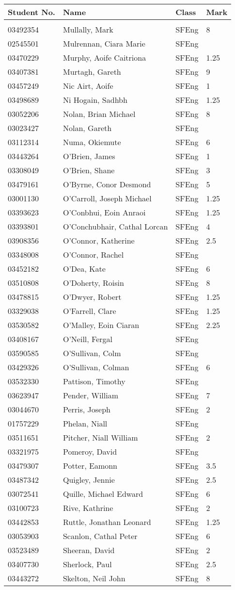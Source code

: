 \documentclass[a4paper]{article}
\begin{document}
\begin{tabular}{llll}
Student No.&Name&Class&Mark\\[3pt]
 \hline\\[3pt]
03492354&Mullally, Mark&SFEng&8\\
02545501&Mulrennan, Ciara Marie&SFEng&\\
03470229&Murphy, Aoife Caitriona&SFEng&1.25\\
03407381&Murtagh, Gareth&SFEng&9\\
03457249&Nic Airt, Aoife&SFEng&1\\
03498689&Ni Hogain, Sadhbh&SFEng&1.25\\
03052206&Nolan, Brian Michael&SFEng&8\\
03023427&Nolan, Gareth&SFEng&\\
03112314&Numa, Okiemute&SFEng&6\\
03443264&O'Brien, James&SFEng&1\\
03308049&O'Brien, Shane&SFEng&3\\
03479161&O'Byrne, Conor Desmond&SFEng&5\\
03001130&O'Carroll, Joseph Michael&SFEng&1.25\\
03393623&O'Conbhui, Eoin Anraoi&SFEng&1.25\\
03393801&O'Conchubhair, Cathal Lorcan&SFEng&4\\
03908356&O'Connor, Katherine&SFEng&2.5\\
03348008&O'Connor, Rachel&SFEng&\\
03452182&O'Dea, Kate&SFEng&6\\
03510808&O'Doherty, Roisin&SFEng&8\\
03478815&O'Dwyer, Robert&SFEng&1.25\\
03329038&O'Farrell, Clare&SFEng&1.25\\
03530582&O'Malley, Eoin Ciaran&SFEng&2.25\\
03408167&O'Neill, Fergal&SFEng&\\
03590585&O'Sullivan, Colm&SFEng&\\
03429326&O'Sullivan, Colman&SFEng&6\\
03532330&Pattison, Timothy&SFEng&\\
03623947&Pender, William&SFEng&7\\
03044670&Perris, Joseph&SFEng&2\\
01757229&Phelan, Niall&SFEng&\\
03511651&Pitcher, Niall William&SFEng&2\\
03321975&Pomeroy, David&SFEng&\\
03479307&Potter, Eamonn&SFEng&3.5\\
03487342&Quigley, Jennie&SFEng&2.5\\
03072541&Quille, Michael Edward&SFEng&6\\
03100723&Rive, Kathrine&SFEng&2\\
03442853&Ruttle, Jonathan Leonard&SFEng&1.25\\
03053903&Scanlon, Cathal Peter&SFEng&6\\
03523489&Sheeran, David&SFEng&2\\
03407730&Sherlock, Paul&SFEng&2.5\\
03443272&Skelton, Neil John&SFEng&8\\
\end{tabular}
\end{document}
